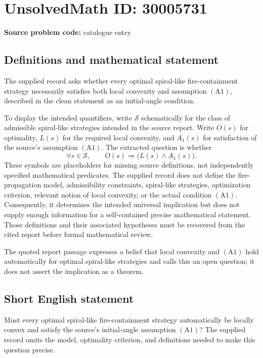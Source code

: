 \documentclass[11pt]{article}
\begin{document}
\section*{UnsolvedMath ID: 30005731}
\textbf{Source problem code:} catalogue entry
\subsection{Definitions and mathematical statement}
The supplied record asks whether every optimal spiral-like fire-containment strategy necessarily satisfies both local convexity and assumption \((\mathrm{A1})\), described in the clean statement as an initial-angle condition.

To display the intended quantifiers, write \(\mathcal S\) schematically for the class of admissible spiral-like strategies intended in the source report. Write \(O(s)\) for optimality, \(L(s)\) for the required local convexity, and \(A_1(s)\) for satisfaction of the source's assumption \((\mathrm{A1})\). The extracted question is whether
\[
\forall s\in\mathcal S,\qquad O(s)\Longrightarrow\bigl(L(s)\land A_1(s)\bigr).
\]
These symbols are placeholders for missing source definitions, not independently specified mathematical predicates. The supplied record does not define the fire-propagation model, admissibility constraints, spiral-like strategies, optimization criterion, relevant notion of local convexity, or the actual condition \((\mathrm{A1})\). Consequently, it determines the intended universal implication but does not supply enough information for a self-contained precise mathematical statement. Those definitions and their associated hypotheses must be recovered from the cited report before formal mathematical review.

The quoted report passage expresses a belief that local convexity and \((\mathrm{A1})\) hold automatically for optimal spiral-like strategies and calls this an open question; it does not assert the implication as a theorem.
\subsection{Short English statement}
Must every optimal spiral-like fire-containment strategy automatically be locally convex and satisfy the source's initial-angle assumption \((\mathrm{A1})\)? The supplied record omits the model, optimality criterion, and definitions needed to make this question precise.
\end{document}
